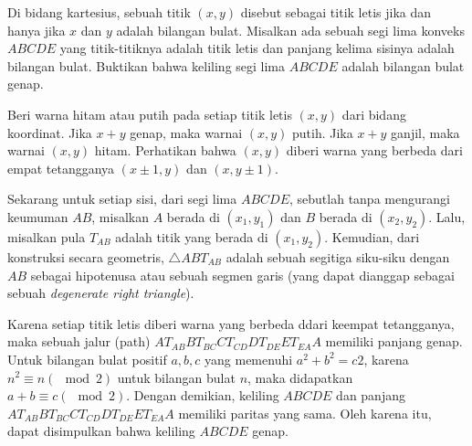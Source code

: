 \documentclass[11pt]{scrartcl}
\begin{document}
\begin{soaljawab}
    Di bidang kartesius, sebuah titik $(x,y)$ disebut sebagai titik letis jika dan
hanya jika $x$ dan $y$ adalah bilangan bulat. Misalkan ada sebuah segi lima konveks $ABCDE$
yang titik-titiknya adalah titik letis dan panjang kelima sisinya adalah bilangan bulat.
Buktikan bahwa keliling segi lima $ABCDE$ adalah bilangan bulat genap.
\begin{solusi}
    Beri warna hitam atau putih pada setiap titik letis $(x,y)$ dari bidang koordinat. Jika $x+y$ genap, maka warnai $(x,y)$ putih. Jika $x+y$ ganjil, maka warnai $(x,y)$ hitam. Perhatikan bahwa $(x,y)$ diberi warna yang berbeda dari empat tetangganya $(x\pm 1,y)$ dan $(x,y\pm 1)$.
    
    Sekarang untuk setiap sisi, dari segi lima $ABCDE$, sebutlah tanpa mengurangi keumuman $AB$,  misalkan $A$ berada di $(x_1, y_1)$ dan $B$ berada di $(x_2, y_2)$. Lalu, misalkan pula $T_{AB}$ adalah titik  yang berada di $(x_1,y_2)$. Kemudian, dari konstruksi secara geometris, $\triangle ABT_{AB}$ adalah sebuah segitiga siku-siku dengan $AB$ sebagai hipotenusa atau sebuah segmen garis (yang dapat dianggap sebagai sebuah \textit{degenerate right triangle}).

     Karena setiap titik letis diberi warna yang berbeda ddari keempat tetangganya, maka sebuah jalur (path) $AT_{AB}BT_{BC}CT_{CD}DT_{DE}ET_{EA}A$ memiliki panjang genap. Untuk bilangan bulat positif $a,b, c$ yang memenuhi $a^2+b^2=c2$, karena $n^2 \equiv n (\mod 2)$ untuk bilangan bulat $n$, maka didapatkan $a+b\equiv c (\mod 2)$. Dengan demikian, keliling $ABCDE$ dan panjang $AT_{AB}BT_{BC}CT_{CD}DT_{DE}ET_{EA}A$ memiliki paritas yang sama. Oleh karena itu, dapat disimpulkan bahwa keliling $ABCDE$ genap.
\end{solusi}
\end{soaljawab}
\end{document}
